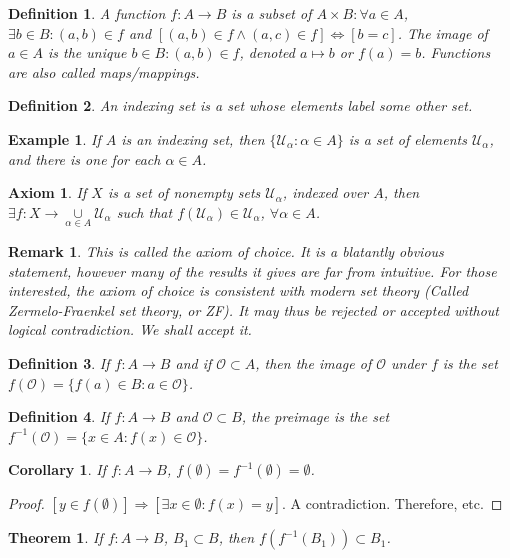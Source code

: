 \documentclass[crop=false,class=book]{standalone}
\theoremstyle{mystyle}
\newtheorem{theorem}{Theorem}[section]
\newtheorem{definition}{Definition}[section]
\newtheorem{corollary}{Corollary}[section]
\newtheorem{example}{Example}[section]
\newtheorem{remark}{Remark}[section]
\newtheorem{axiom}{Axiom}[section]
\begin{document}
\begin{definition}
A function $f:A\rightarrow B$ is a subset of $A\times B: \forall a\in A$, $\exists b\in B: (a,b)\in f$ and $[(a,b)\in f\land (a,c)\in f]\Leftrightarrow [b=c]$. The image of $a\in A$ is the unique $b\in B:(a,b)\in f$, denoted $a\mapsto b$ or $f(a)=b$. Functions are also called maps/mappings.
\end{definition}
\begin{definition}
An indexing set is a set whose elements label some other set.
\end{definition}
\begin{example}
If $A$ is an indexing set, then $\{\mathcal{U}_{\alpha}:\alpha \in A\}$ is a set of elements $\mathcal{U}_{\alpha}$, and there is one for each $\alpha \in A$.
\end{example}
\begin{axiom}
If $X$ is a set of nonempty sets $\mathcal{U}_{\alpha}$, indexed over $A$, then $\exists f:X\rightarrow \underset{\alpha \in A}\cup \mathcal{U}_{\alpha}$ such that $f(\mathcal{U}_{\alpha}) \in \mathcal{U}_{\alpha}$, $\forall \alpha\in A$.
\end{axiom}
\begin{remark}
This is called the axiom of choice. It is a blatantly obvious statement, however many of the results it gives are far from intuitive. For those interested, the axiom of choice is consistent with modern set theory (Called Zermelo-Fraenkel set theory, or ZF). It may thus be rejected or accepted without logical contradiction. We shall accept it.
\end{remark}
\begin{definition}
If $f:A\rightarrow B$ and if $\mathcal{O}\subset A$, then the image of $\mathcal{O}$ under $f$ is the set $f(\mathcal{O}) = \{f(a)\in B:a\in \mathcal{O}\}$.
\end{definition}
\begin{definition}
If $f:A\rightarrow B$ and $\mathscr{O}\subset B$, the preimage is the set $f^{-1}(\mathscr{O}) = \{x\in A:f(x)\in \mathscr{O}\}$.
\end{definition}
\begin{corollary}
If $f:A\rightarrow B$, $f(\emptyset) = f^{-1}(\emptyset) = \emptyset$.
\end{corollary}
\begin{proof}
$[y\in f(\emptyset)]\Rightarrow [\exists x\in \emptyset:f(x)=y]$. A contradiction. Therefore, etc.
\end{proof}
\begin{theorem}
If $f:A\rightarrow B$, $B_1\subset B$, then $f(f^{-1}(B_1))\subset B_1$.
\end{theorem}
\end{document}

